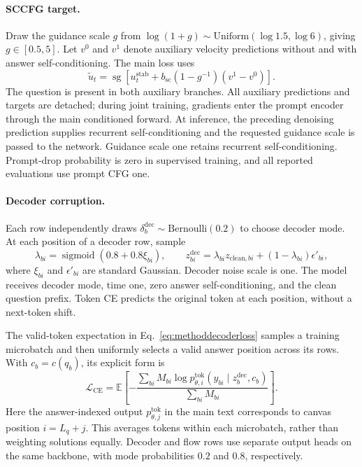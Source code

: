 \documentclass[11pt,letterpaper]{article}
\newcommand{\E}{\mathbb{E}}
\newcommand{\sg}{\operatorname{sg}}
\begin{document}
\paragraph{SCCFG target.}
Draw the guidance scale $g$ from $\log(1+g)\sim\mathrm{Uniform}(\log1.5,\log6)$, giving $g\in[0.5,5]$. Let $v^0$ and $v^1$ denote auxiliary velocity predictions without and with answer self-conditioning. The main loss uses
\begin{equation}
 \widetilde u_t=\sg\!\left[u_t^{\mathrm{stab}}+b_{\mathrm{sc}}(1-g^{-1})(v^1-v^0)\right].
 \label{eq:methodscguidance}
\end{equation}
The question is present in both auxiliary branches. All auxiliary predictions and targets are detached; during joint training, gradients enter the prompt encoder through the main conditioned forward. At inference, the preceding denoising prediction supplies recurrent self-conditioning and the requested guidance scale is passed to the network. Guidance scale one retains recurrent self-conditioning. Prompt-drop probability is zero in supervised training, and all reported evaluations use prompt CFG one.

\paragraph{Decoder corruption.}
Each row independently draws $\delta_b^{\mathrm{dec}}\sim\mathrm{Bernoulli}(0.2)$ to choose decoder mode. At each position of a decoder row, sample
\[
 \lambda_{bi}=\operatorname{sigmoid}(0.8+0.8\xi_{bi}),\qquad
 z^{\mathrm{dec}}_{bi}=\lambda_{bi}z_{\mathrm{clean},bi}+(1-\lambda_{bi})\epsilon'_{bi},
\]
where $\xi_{bi}$ and $\epsilon'_{bi}$ are standard Gaussian. Decoder noise scale is one. The model receives decoder mode, time one, zero answer self-conditioning, and the clean question prefix. Token CE predicts the original token at each position, without a next-token shift.

The valid-token expectation in Eq.~\eqref{eq:methoddecoderloss} samples a training microbatch and then uniformly selects a valid answer position across its rows. With $c_b=c(q_b)$, its explicit form is
\begin{equation}
 \mathcal L_{\mathrm{CE}}=
 \E\!\left[-\frac{\sum_{bi} M_{bi}\log p_{\theta,i}^{\mathrm{tok}}(y_{bi}\mid z_b^{\mathrm{dec}},c_b)}
 {\sum_{bi} M_{bi}}\right].
 \label{eq:methoddecoderlossexpanded}
\end{equation}
Here the answer-indexed output $p_{\theta,j}^{\mathrm{tok}}$ in the main text corresponds to canvas position $i=L_q+j$. This averages tokens within each microbatch, rather than weighting solutions equally. Decoder and flow rows use separate output heads on the same backbone, with mode probabilities $0.2$ and $0.8$, respectively.
\end{document}
